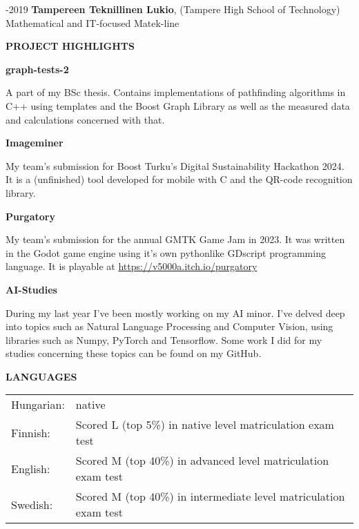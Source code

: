 \documentclass{article}
\begin{document}
-2019 \hspace{1.85cm}\textbf{Tampereen Teknillinen Lukio}, (Tampere High School of Technology) \newline
\hspace*{3.35cm} Mathematical and IT-focused Matek-line \newline

\vspace{1cm}
\textbf{\LARGE PROJECT HIGHLIGHTS}
\vspace{0.5cm}

\textbf{\large graph-tests-2}
\vspace{0.5cm}

\noindent A part of my BSc thesis. Contains implementations of pathfinding 
algorithms in C++ using templates and the Boost Graph Library as well as the 
measured data and calculations concerned with that.

\vspace{0.5cm}
\textbf{\large Imageminer}
\vspace{0.5cm}

\noindent My team's submission for Boost Turku's Digital Sustainability 
Hackathon 2024. It is a (unfinished) tool developed for mobile with C and the 
QR-code recognition library.

\vspace{0.5cm}
\textbf{\large Purgatory}
\vspace{0.5cm}

\noindent My team's submission for the annual GMTK Game Jam in 2023. It was 
written in the Godot game engine using it's own pythonlike GDscript 
programming language. It is playable at 
\href{https://v5000a.itch.io/purgatory}{https://v5000a.itch.io/purgatory}

\vspace{0.5cm}
\textbf{\large AI-Studies}
\vspace{0.5cm}

\noindent During my last year I've been mostly working on my AI minor. I've 
delved deep into topics such as Natural Language Processing and Computer 
Vision, using libraries such as Numpy, PyTorch and Tensorflow. Some work I did 
for my studies concerning these topics can be found on my GitHub.

\vspace{1cm}
\textbf{\LARGE LANGUAGES}
\vspace{0.5cm}

\noindent\begin{tabularx}{\linewidth}{l X}
Hungarian: & native \\
Finnish: & Scored L (top 5\%) in native level matriculation exam test \\
English: & Scored M (top 40\%) in advanced level matriculation exam test \\
Swedish: & Scored M (top 40\%) in intermediate level matriculation exam test \\
\end{tabularx}
\end{document}
